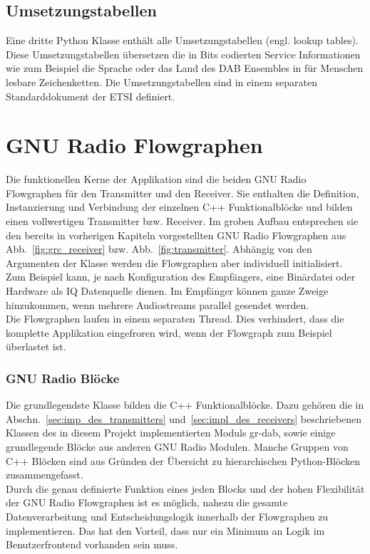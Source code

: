 \subsection{Umsetzungstabellen}
Eine dritte Python Klasse enthält alle Umsetzungstabellen (engl. lookup tables). Diese Umsetzungstabellen übersetzen die in Bits codierten Service Informationen wie zum Beispiel die Sprache oder das Land des DAB Ensembles in für Menschen lesbare Zeichenketten. Die Umsetzungstabellen sind in einem separaten Standarddokument der ETSI \cite{etsi:registered_tables} definiert.

\section{GNU Radio Flowgraphen}
Die funktionellen Kerne der Applikation sind die beiden GNU Radio Flowgraphen für den Transmitter und den Receiver. Sie enthalten die Definition, Instanzierung und Verbindung der einzelnen C++ Funktionalblöcke und bilden einen vollwertigen Transmitter bzw. Receiver. Im groben Aufbau entsprechen sie den bereits in vorherigen Kapiteln vorgestellten GNU Radio Flowgraphen aus Abb.~\ref{fig:grc_receiver} bzw. Abb.~\ref{fig:transmitter}. Abhängig von den Argumenten der Klasse werden die Flowgraphen aber individuell initialisiert. Zum Beispiel kann, je nach Konfiguration des Empfängers, eine Binärdatei oder Hardware als IQ Datenquelle dienen. Im Empfänger können ganze Zweige hinzukommen, wenn mehrere Audiostreams parallel gesendet werden.\\
Die Flowgraphen laufen in einem separaten Thread. Dies verhindert, dass die komplette Applikation eingefroren wird, wenn der Flowgraph zum Beispiel überlastet ist.

\subsubsection{GNU Radio Blöcke}
Die grundlegendste Klasse bilden die C++ Funktionalblöcke. Dazu gehören die in Abschn.~\ref{sec:imp_des_transmitters} und~\ref{sec:impl_des_receivers} beschriebenen Klassen des in diesem Projekt implementierten Moduls gr-dab, sowie einige grundlegende Blöcke aus anderen GNU Radio Modulen. Manche Gruppen von C++ Blöcken sind aus Gründen der Übersicht zu hierarchischen Python-Blöcken zusammengefasst.\\

Durch die genau definierte Funktion eines jeden Blocks und der hohen Flexibilität der GNU Radio Flowgraphen ist es möglich, nahezu die gesamte Datenverarbeitung und Entscheidungslogik innerhalb der Flowgraphen zu implementieren. Das hat den Vorteil, dass nur ein Minimum an Logik im Benutzerfrontend vorhanden sein muss.


